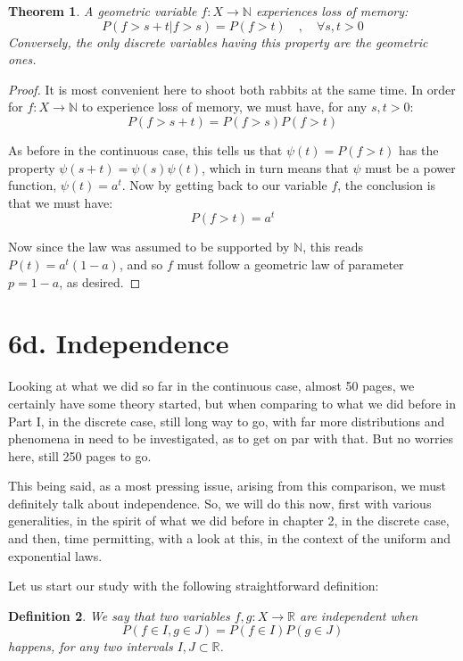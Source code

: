 \documentclass[12pt]{amsbook}
\newtheorem{theorem}{Theorem}[chapter]
\newtheorem{definition}[theorem]{Definition}
\begin{document}
\begin{theorem}
A geometric variable $f:X\to\mathbb N$ experiences loss of memory:
$$P(f>s+t|f>s)=P(f>t)\quad,\quad\forall s,t>0$$
Conversely, the only discrete variables having this property are the geometric ones. 
\end{theorem}

\begin{proof}
It is most convenient here to shoot both rabbits at the same time. In order for $f:X\to\mathbb N$ to experience loss of memory, we must have, for any $s,t>0$:
$$P(f>s+t)=P(f>s)P(f>t)$$

As before in the continuous case, this tells us that $\psi(t)=P(f>t)$ has the property $\psi(s+t)=\psi(s)\psi(t)$, which in turn means that $\psi$ must be a power function, $\psi(t)=a^t$. Now by getting back to our variable $f$, the conclusion is that we must have:
$$P(f>t)=a^t$$

Now since the law was assumed to be supported by $\mathbb N$, this reads $P(t)=a^t(1-a)$, and so $f$ must follow a geometric law of parameter $p=1-a$, as desired.
\end{proof}

\section*{6d. Independence}

Looking at what we did so far in the continuous case, almost 50 pages, we certainly have some theory started, but when comparing to what we did before in Part I, in the discrete case, still long way to go, with far more distributions and phenomena in need to be investigated, as to get on par with that. But no worries here, still 250 pages to go.

\bigskip

This being said, as a most pressing issue, arising from this comparison, we must definitely talk about independence. So, we will do this now, first with various generalities, in the spirit of what we did before in chapter 2, in the discrete case, and then, time permitting, with a look at this, in the context of the uniform and exponential laws.

\bigskip

Let us start our study with the following straightforward definition:


\begin{definition}
We say that two variables $f,g:X\to\mathbb R$ are independent when
$$P(f\in I,g\in J)=P(f\in I)P(g\in J)$$
happens, for any two intervals $I,J\subset\mathbb R$.
\end{definition}
\end{document}
